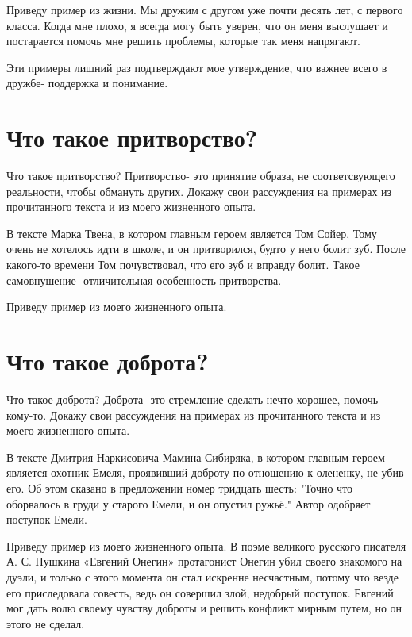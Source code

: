 \documentclass[12pt, letterpaper]{article}
\begin{document}
Приведу пример из жизни. Мы дружим с другом уже почти десять лет, с первого класса. Когда мне плохо, я всегда могу быть уверен, что он меня выслушает и постарается помочь мне решить проблемы, которые так меня напрягают.

Эти примеры лишний раз подтверждают мое утверждение,  что важнее всего в дружбе-  поддержка и понимание.

\section{Что такое притворство?}

Что такое притворство? Притворство- это принятие образа, не соответсвующего реальности, чтобы обмануть других. Докажу свои рассуждения на примерах из прочитанного текста и из моего жизненного опыта.

В тексте Марка Твена, в котором главным героем является Том Сойер, Тому очень не хотелось идти в школе, и он притворился, будто у него болит зуб. После какого-то времени Том почувствовал, что его зуб и вправду болит. Такое самовнушение- отличительная особенность притворства.

Приведу пример из моего жизненного опыта.

\section{Что такое доброта?}
Что такое доброта? Доброта- зто стремление сделать нечто хорошее, помочь кому-то. Докажу свои рассуждения на примерах из прочитанного текста и из моего жизненного опыта.

В тексте Дмитрия Наркисовича Мамина-Сибиряка, в котором главным героем является охотник Емеля, проявивший доброту по отношению к олененку, не убив его. Об этом сказано в предложении номер тридцать шесть: "Точно что оборвалось в груди у старого Емели, и он опустил ружьё." Автор одобряет поступок Емели.

Приведу пример из моего жизненного опыта. В поэме великого русского писателя А. С. Пушкина «Евгений Онегин» протагонист Онегин убил своего знакомого на дуэли, и только с этого момента он стал искренне несчастным, потому что везде его приследовала совесть, ведь он совершил злой, недобрый поступок. Евгений мог дать волю своему чувству доброты и решить конфликт мирным путем, но он этого не сделал.
\end{document}
